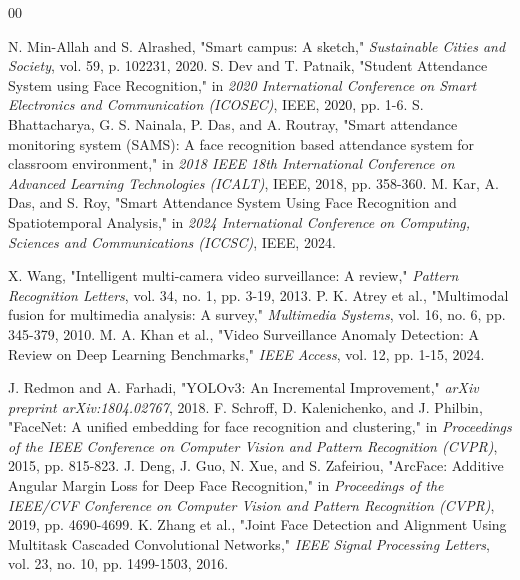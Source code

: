 \documentclass[conference]{IEEEtran}
\begin{document}
\begin{thebibliography}{00}

 N. Min-Allah and S. Alrashed, "Smart campus: A sketch," \textit{Sustainable Cities and Society}, vol. 59, p. 102231, 2020.
 S. Dev and T. Patnaik, "Student Attendance System using Face Recognition," in \textit{2020 International Conference on Smart Electronics and Communication (ICOSEC)}, IEEE, 2020, pp. 1-6.
 S. Bhattacharya, G. S. Nainala, P. Das, and A. Routray, "Smart attendance monitoring system (SAMS): A face recognition based attendance system for classroom environment," in \textit{2018 IEEE 18th International Conference on Advanced Learning Technologies (ICALT)}, IEEE, 2018, pp. 358-360.
 M. Kar, A. Das, and S. Roy, "Smart Attendance System Using Face Recognition and Spatiotemporal Analysis," in \textit{2024 International Conference on Computing, Sciences and Communications (ICCSC)}, IEEE, 2024.

 X. Wang, "Intelligent multi-camera video surveillance: A review," \textit{Pattern Recognition Letters}, vol. 34, no. 1, pp. 3-19, 2013.
 P. K. Atrey et al., "Multimodal fusion for multimedia analysis: A survey," \textit{Multimedia Systems}, vol. 16, no. 6, pp. 345-379, 2010.
 M. A. Khan et al., "Video Surveillance Anomaly Detection: A Review on Deep Learning Benchmarks," \textit{IEEE Access}, vol. 12, pp. 1-15, 2024.

 J. Redmon and A. Farhadi, "YOLOv3: An Incremental Improvement," \textit{arXiv preprint arXiv:1804.02767}, 2018.
 F. Schroff, D. Kalenichenko, and J. Philbin, "FaceNet: A unified embedding for face recognition and clustering," in \textit{Proceedings of the IEEE Conference on Computer Vision and Pattern Recognition (CVPR)}, 2015, pp. 815-823.
 J. Deng, J. Guo, N. Xue, and S. Zafeiriou, "ArcFace: Additive Angular Margin Loss for Deep Face Recognition," in \textit{Proceedings of the IEEE/CVF Conference on Computer Vision and Pattern Recognition (CVPR)}, 2019, pp. 4690-4699.
 K. Zhang et al., "Joint Face Detection and Alignment Using Multitask Cascaded Convolutional Networks," \textit{IEEE Signal Processing Letters}, vol. 23, no. 10, pp. 1499-1503, 2016.


\end{thebibliography}
\end{document}
